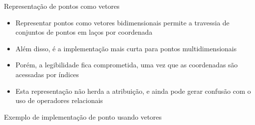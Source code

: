 \begin{frame}[fragile]{Representação de pontos como vetores}

    \begin{itemize}
        \item Representar pontos como vetores bidimensionais permite a travessia de conjuntos
            de pontos em laços por coordenada
        \pause

        \item Além disso, é a implementação mais curta para pontos multidimensionais
        \pause

        \item Porém, a legibilidade fica comprometida, uma vez que as coordenadas são acessadas
        \pause
            por índices

        \item Esta representação não herda a atribuição, e ainda pode gerar 
            confusão com o uso de operadores relacionais
    \end{itemize}

\end{frame}

\begin{frame}[fragile]{Exemplo de implementação de ponto usando vetores}


\end{frame}
